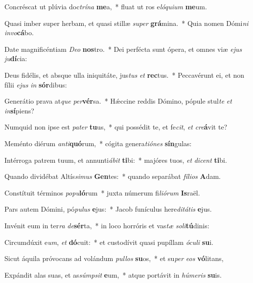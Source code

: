 \item Concréscat ut plúvia doc\textit{trí}\textit{na} \textbf{me}a,~* fluat ut ros e\textit{ló}\textit{qui}\textit{um} \textbf{me}um.
\item Quasi imber super herbam, et quasi stillæ \textit{su}\textit{per} \textbf{grá}mina.~* Quia nomen Dómi\textit{ni} \textit{in}\textit{vo}\textbf{cá}bo.
\item Date magnificéntiam \textit{De}\textit{o} \textbf{nos}tro.~* Dei perfécta sunt ópera, et omnes viæ \textit{e}\textit{jus} \textit{ju}\textbf{dí}cia:
\item Deus fidélis, et absque ulla iniquitáte, jus\textit{tus} \textit{et} \textbf{rec}tus.~* Peccavérunt ei, et non fílii \textit{e}\textit{jus} \textit{in} \textbf{sór}dibus:
\item Generátio prava at\textit{que} \textit{per}\textbf{vér}sa.~* Hǽccine reddis Dómino, pópule stul\textit{te} \textit{et} \textit{in}\textbf{sí}piens?
\item Numquid non ipse est \textit{pa}\textit{ter} \textbf{tu}us,~* qui possédit te, et fe\textit{cit}, \textit{et} \textit{cre}\textbf{á}vit te?
\item Meménto diérum \textit{an}\textit{ti}\textbf{quó}rum,~* cógita genera\textit{ti}\textit{ó}\textit{nes} \textbf{sín}gulas:
\item Intérroga patrem tuum, et annunti\textit{á}\textit{bit} \textbf{ti}bi:~* majóres tuos, \textit{et} \textit{di}\textit{cent} \textbf{ti}bi.
\item Quando dividébat Altís\textit{si}\textit{mus} \textbf{Gen}tes:~* quando separábat \textit{fí}\textit{li}\textit{os} \textbf{A}dam.
\item Constítuit términos \textit{po}\textit{pu}\textbf{ló}rum~* juxta númerum fi\textit{li}\textit{ó}\textit{rum} \textbf{Is}raël.
\item Pars autem Dómini, pó\textit{pu}\textit{lus} \textbf{e}jus:~* Jacob funículus here\textit{di}\textit{tá}\textit{tis} \textbf{e}jus.
\item Invénit eum in ter\textit{ra} \textit{de}\textbf{sér}ta,~* in loco horróris et vas\textit{tæ} \textit{so}\textit{li}\textbf{tú}dinis:
\item Circumdúxit e\textit{um}, \textit{et} \textbf{dó}cuit:~* et custodívit quasi pupíllam \textit{ó}\textit{cu}\textit{li} \textbf{su}i.
\item Sicut áquila próvocans ad volándum \textit{pul}\textit{los} \textbf{su}os,~* et su\textit{per} \textit{e}\textit{os} \textbf{vó}litans,
\item Expándit alas suas, et as\textit{súmp}\textit{sit} \textbf{e}um,~* atque portávit in \textit{hú}\textit{me}\textit{ris} \textbf{su}is.

